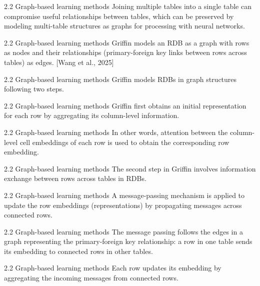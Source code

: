 \documentclass[aspectratio=169,10pt]{beamer}
\newcommand{\cit}[1]{{\scriptsize\color{gray}[#1]}}
\begin{document}
\begin{frame}{2.2 Graph-based learning methods}
Joining multiple tables into a single table can compromise useful relationships between tables, which can be preserved by modeling multi-table structures as graphs for processing with neural networks.
\end{frame}

\begin{frame}{2.2 Graph-based learning methods}
Griffin models an RDB as a graph with rows as nodes and their relationships (primary-foreign key links between rows across tables) as edges.
\cit{Wang et al., 2025}
\end{frame}

\begin{frame}{2.2 Graph-based learning methods}
Griffin models RDBs in graph structures following two steps.
\end{frame}

\begin{frame}{2.2 Graph-based learning methods}
Griffin first obtains an initial representation for each row by aggregating its column-level information.
\end{frame}

\begin{frame}{2.2 Graph-based learning methods}
In other words, attention between the column-level cell embeddings of each row is used to obtain the corresponding row embedding.
\end{frame}

\begin{frame}{2.2 Graph-based learning methods}
The second step in Griffin involves information exchange between rows across tables in RDBs.
\end{frame}

\begin{frame}{2.2 Graph-based learning methods}
A message-passing mechanism is applied to update the row embeddings (representations) by propagating messages across connected rows.
\end{frame}

\begin{frame}{2.2 Graph-based learning methods}
The message passing follows the edges in a graph representing the primary-foreign key relationship: a row in one table sends its embedding to connected rows in other tables.
\end{frame}

\begin{frame}{2.2 Graph-based learning methods}
Each row updates its embedding by aggregating the incoming messages from connected rows.
\end{frame}
\end{document}
